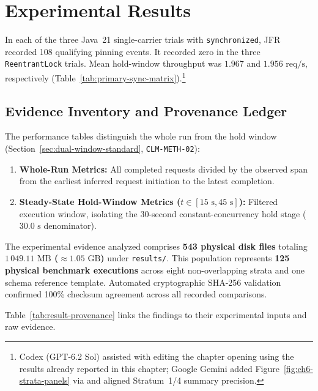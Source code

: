\chapter{Experimental Results}
\label{ch:results}

In each of the three Java~21 single-carrier trials with \texttt{synchronized}, JFR recorded 108 qualifying pinning events. It recorded zero in the three \texttt{ReentrantLock} trials. Mean hold-window throughput was $1.967$ and $1.956\text{ req/s}$, respectively (Table~\ref{tab:primary-sync-matrix}).\footnote{Codex (GPT-6.2 Sol) assisted with editing the chapter opening using the results already reported in this chapter; Google Gemini added Figure~\ref{fig:ch6-strata-panels} via  and aligned Stratum~1/4 summary precision.}

\section{Evidence Inventory and Provenance Ledger}
\label{sec:evidence-inventory}

The performance tables distinguish the whole run from the hold window (Section~\ref{sec:dual-window-standard}, \texttt{CLM-METH-02}):
\begin{enumerate}
  \item \textbf{Whole-Run Metrics:} All completed requests divided by the observed span from the earliest inferred request initiation to the latest completion.
  \item \textbf{Steady-State Hold-Window Metrics ($t \in [15\text{ s}, 45\text{ s}]$):} Filtered execution window, isolating the 30-second constant-concurrency hold stage ($30.0\text{ s}$ denominator).
\end{enumerate}

The experimental evidence analyzed comprises \textbf{543 physical disk files} totaling \textbf{$1\,049.11\text{ MB}$ ($\approx 1.05\text{ GB}$)} under \texttt{results/}. This population represents \textbf{125 physical benchmark executions} across eight non-overlapping strata and one schema reference template. Automated cryptographic SHA-256 validation confirmed 100\% checksum agreement across all recorded comparisons.

Table~\ref{tab:result-provenance} links the findings to their experimental inputs and raw evidence.

